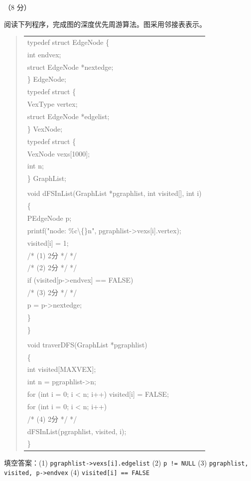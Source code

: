 \begin{question}[深度优先周游]（8 分）

阅读下列程序，完成图的深度优先周游算法。图采用邻接表表示。

\begin{quote}
\footnotesize
\begin{tabular}{@{}l@{}}
typedef struct EdgeNode \{\\
    int endvex;\\
    struct EdgeNode *nextedge;\\
\} EdgeNode;\\
typedef struct \{\\
    VexType vertex;\\
    struct EdgeNode *edgelist;\\
\} VexNode;\\
typedef struct \{\\
    VexNode vexs[1000];\\
    int n;\\
\} GraphList;\\
\\
void dFSInList(GraphList *pgraphlist, int visited[], int i)\\
\{\\
    PEdgeNode p;\\
    printf("node: \%c\textbackslash\{\}n", pgraphlist->vexs[i].vertex);\\
    visited[i] = 1;\\
\underline{\hspace{12em}} /* (1) 2分 */ */\\
\underline{\hspace{12em}} /* (2) 2分 */ */\\
        if (visited[p->endvex] == FALSE)\\
\underline{\hspace{12em}} /* (3) 2分 */ */\\
        p = p->nextedge;\\
    \}\\
\}\\
\\
void traverDFS(GraphList *pgraphlist)\\
\{\\
    int visited[MAXVEX];\\
    int n = pgraphlist->n;\\
    for (int i = 0; i < n; i++) visited[i] = FALSE;\\
    for (int i = 0; i < n; i++)\\
\underline{\hspace{12em}} /* (4) 2分 */ */\\
            dFSInList(pgraphlist, visited, i);\\
\}\\
\end{tabular}
\end{quote}

\begin{solution}
填空答案：(1) \texttt{pgraphlist->vexs[i].edgelist} (2) \texttt{p != NULL} (3) \texttt{pgraphlist, visited, p->endvex} (4) \texttt{visited[i] == FALSE}
\end{solution}
\end{question}

\clearpage
